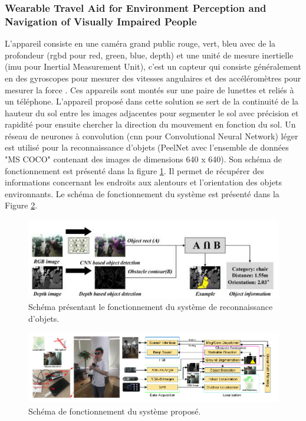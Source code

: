 \documentclass[11pt]{article}
\begin{document}
        \subsubsection{Wearable Travel Aid for Environment Perception and Navigation of Visually Impaired People}
          L'appareil consiste en une caméra grand public rouge, vert, bleu avec de la profondeur (\acrshort{rgbd} pour red, green, blue, depth)
          et une unité de mesure inertielle (\acrshort{imu} pour Inertial Measurement Unit), c'est un capteur qui consiste généralement en des gyroscopes 
          pour mesurer des vitesses angulaires et des accéléromètres pour mesurer la force \cite{baiWearableTravelAid2019}. Ces appareils sont montés sur une paire de lunettes
          et reliés à un téléphone. L'appareil proposé dans cette solution se sert de la continuité de la hauteur du sol entre les images 
          adjacentes pour segmenter le sol avec précision et rapidité pour ensuite chercher la direction du mouvement en fonction du sol.
          Un réseau de neurones à convolution (\acrshort{cnn} pour Convolutional Neural Network) léger est utilisé pour la reconnaissance d'objets 
          (PeelNet avec l'ensemble de données "MS COCO" contenant des images de dimensions 640 x 640). Son schéma de fonctionnement est présenté 
          dans la figure \ref{fig:ReconnaissanceP1}. Il permet de récupérer des informations concernant les endroits aux alentours et l'orientation 
          des objets environnants. Le schéma de fonctionnement du système est présenté dans la Figure \ref{fig:PipelineP1}.

          \begin{figure}[hbt]  
            \includegraphics[width=\textwidth]{RecognitionP1.png}    
            \caption{Schéma présentant le fonctionnement du système de reconnaissance d'objets.}
            \label{fig:ReconnaissanceP1}
          \end{figure} 

          \begin{figure}[hbt]  
            \includegraphics[width=\textwidth]{PipelineP1.png}    
            \caption{Schéma de fonctionnement du système proposé.}
            \label{fig:PipelineP1}
          \end{figure} 
\end{document}

